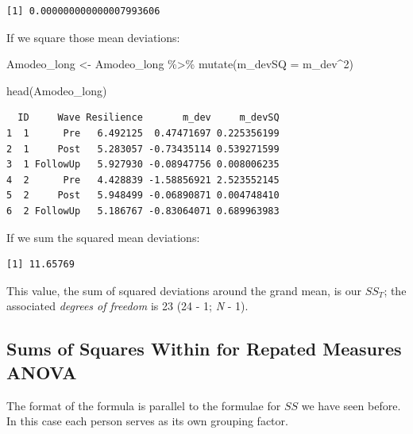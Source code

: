 \documentclass[
  11pt,
]{book}
\newenvironment{Shaded}{\begin{snugshade}}{\end{snugshade}}
\newcommand{\AttributeTok}[1]{\textcolor[rgb]{0.77,0.63,0.00}{#1}}
\newcommand{\DecValTok}[1]{\textcolor[rgb]{0.00,0.00,0.81}{#1}}
\newcommand{\FunctionTok}[1]{\textcolor[rgb]{0.00,0.00,0.00}{#1}}
\newcommand{\NormalTok}[1]{#1}
\newcommand{\OtherTok}[1]{\textcolor[rgb]{0.56,0.35,0.01}{#1}}
\newcommand{\SpecialCharTok}[1]{\textcolor[rgb]{0.00,0.00,0.00}{#1}}
\begin{document}
\begin{verbatim}
[1] 0.000000000000007993606
\end{verbatim}

If we square those mean deviations:

\begin{Shaded}
\begin{Highlighting}[]
\NormalTok{Amodeo\_long }\OtherTok{\textless{}{-}}\NormalTok{ Amodeo\_long }\SpecialCharTok{\%\textgreater{}\%} 
  \FunctionTok{mutate}\NormalTok{(}\AttributeTok{m\_devSQ =}\NormalTok{ m\_dev}\SpecialCharTok{\^{}}\DecValTok{2}\NormalTok{)}

\FunctionTok{head}\NormalTok{(Amodeo\_long)}
\end{Highlighting}
\end{Shaded}

\begin{verbatim}
  ID     Wave Resilience       m_dev     m_devSQ
1  1      Pre   6.492125  0.47471697 0.225356199
2  1     Post   5.283057 -0.73435114 0.539271599
3  1 FollowUp   5.927930 -0.08947756 0.008006235
4  2      Pre   4.428839 -1.58856921 2.523552145
5  2     Post   5.948499 -0.06890871 0.004748410
6  2 FollowUp   5.186767 -0.83064071 0.689963983
\end{verbatim}

If we sum the squared mean deviations:

\begin{Shaded}
\end{Shaded}

\begin{verbatim}
[1] 11.65769
\end{verbatim}

This value, the sum of squared deviations around the grand mean, is our \(SS_T\); the associated \emph{degrees of freedom} is 23 (24 - 1; \emph{N} - 1).

\hypertarget{sums-of-squares-within-for-repated-measures-anova}{%
\subsection{Sums of Squares Within for Repated Measures ANOVA}\label{sums-of-squares-within-for-repated-measures-anova}}

The format of the formula is parallel to the formulae for \(SS\) we have seen before. In this case each person serves as its own grouping factor.
\end{document}
